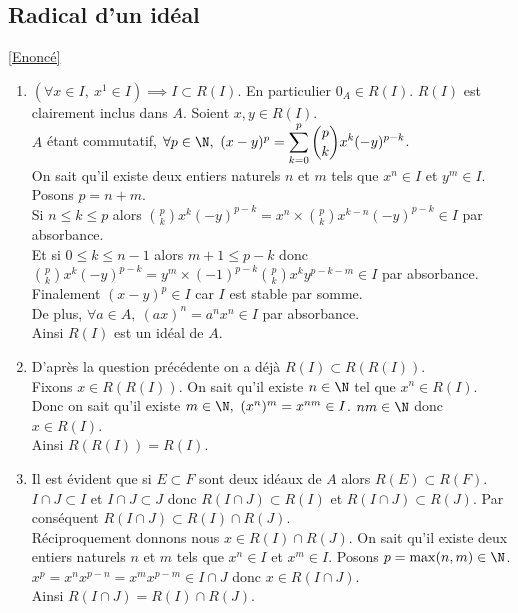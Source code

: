 \documentclass[8pt]{book}
\begin{document}
	\subsection{Radical d'un idéal }
	\label{Radical d'un idéal corrigé}
	\textcolor{blue}{\hyperref[Radical d'un idéal]{[Enoncé]}}\\
	\begin{enumerate}[leftmargin=*]
		\item $(\forall x\in I,\ x^1\in I)\implies I\subset R(I)$. En particulier $0_A\in R(I)$. $R(I)$ est clairement inclus dans $A$. Soient $x,y\in R(I)$.\\
		$A$ étant commutatif, $\forall p\in \N,\ (x-y)^p=\displaystyle\sum_{k=0}^p\binom{p}{k}x^k(-y)^{p-k}$.\\
		On sait qu'il existe deux entiers naturels $n$ et $m$ tels que $x^n\in I$ et $y^m\in I$. Posons $p=n+m$.\\
		Si $n\leq k\leq p$ alors $\displaystyle\binom{p}{k}x^k(-y)^{p-k}=x^n\times \binom{p}{k}x^{k-n}(-y)^{p-k}\in I$ par absorbance.\\
		Et si $0\leq k\leq n-1$ alors $m+1\leq p-k$ donc $\displaystyle\binom{p}{k}x^k(-y)^{p-k}=y^m\times (-1)^{p-k}\binom{p}{k}x^ky^{p-k-m}\in I$ par absorbance.\\
		Finalement $(x-y)^p\in I$ car $I$ est stable par somme.\\
		De plus, $\forall a\in A,\ (ax)^n=a^nx^n\in I$ par absorbance.\\
		Ainsi $R(I)$ est un idéal de $A$.
		\item D'après la question précédente on a déjà $R(I)\subset R(R(I))$.\\
		Fixons $x\in R(R(I))$. On sait qu'il existe $n\in \N$ tel que $x^n\in R(I)$. Donc on sait qu'il existe $m\in \N,\ (x^n)^m=x^{nm}\in I$. $nm\in \N$ donc $x\in R(I)$.\\
		Ainsi $R(R(I))=R(I)$.
		\item Il est évident que si $E\subset F$ sont deux idéaux de $A$ alors $R(E)\subset R(F)$. $I\cap J\subset I$ et $I\cap J\subset J$ donc $R(I\cap J)\subset R(I)$ et $R(I\cap J)\subset R(J)$. Par conséquent $R(I\cap J)\subset R(I)\cap R(J)$.\\
		Réciproquement donnons nous $x\in R(I)\cap R(J)$. On sait qu'il existe deux entiers naturels $n$ et $m$ tels que $x^n\in I$ et $x^m\in I$. Posons $p=\max(n,m)\in \N$. $x^p=x^nx^{p-n}=x^mx^{p-m}\in I\cap J$ donc $x\in R(I\cap J)$.\\
		Ainsi $R(I\cap J)=R(I)\cap R(J)$.
	\end{enumerate}
	
\end{document}
